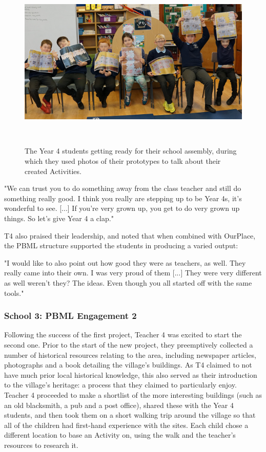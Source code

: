 \begin{figure}
\centering
  \includegraphics[width=0.8\columnwidth]{images/chapter08/assembly.jpg}
  \caption[Year 4 students hosting a school assembly to talk about their Activities]{The Year 4 students getting ready for their school assembly, during which they used photos of their prototypes to talk about their created Activities.}~\label{fig:Assembly}
\end{figure}

\begin{displayquote}
"We can trust you to do something away from the class teacher and still do something really good. I think you really are stepping up to be Year 4s, it's wonderful to see. [...] If you're very grown up, you get to do very grown up things. So let's give Year 4 a clap."
\end{displayquote}

T4 also praised their leadership, and noted that when combined with OurPlace, the PBML structure supported the students in producing a varied output:

\begin{displayquote}
"I would like to also point out how good they were as teachers, as well. They really came into their own. I was very proud of them [...] They were very different as well weren't they? The ideas. Even though you all started off with the same tools."
\end{displayquote}

\subsubsection{School 3: PBML Engagement 2}

Following the success of the first project, Teacher 4 was excited to start the second one. Prior to the start of the new project, they preemptively collected a number of historical resources relating to the area, including newspaper articles, photographs and a book detailing the village's buildings. As T4 claimed to not have much prior local historical knowledge, this also served as their introduction to the village's heritage: a process that they claimed to particularly enjoy. Teacher 4 proceeded to make a shortlist of the more interesting buildings (such as an old blacksmith, a pub and a post office), shared these with the Year 4 students, and then took them on a short walking trip around the village so that all of the children had first-hand experience with the sites. Each child chose a different location to base an Activity on, using the walk and the teacher's resources to research it.

